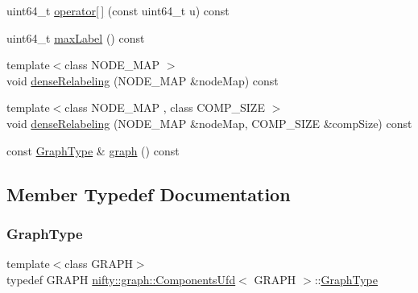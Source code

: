 \begin{DoxyCompactItemize}
\item 
uint64\+\_\+t \hyperlink{classnifty_1_1graph_1_1ComponentsUfd_a9b49939a2a5ffe4ae5c246d65d4302aa}{operator\mbox{[}$\,$\mbox{]}} (const uint64\+\_\+t u) const
\item 
uint64\+\_\+t \hyperlink{classnifty_1_1graph_1_1ComponentsUfd_a675a98fdcf175d7157041633cde35c37}{max\+Label} () const
\item 
{\footnotesize template$<$class N\+O\+D\+E\+\_\+\+M\+AP $>$ }\\void \hyperlink{classnifty_1_1graph_1_1ComponentsUfd_af9d0873f2dd65ca662fe886ef3ae43ff}{dense\+Relabeling} (N\+O\+D\+E\+\_\+\+M\+AP \&node\+Map) const
\item 
{\footnotesize template$<$class N\+O\+D\+E\+\_\+\+M\+AP , class C\+O\+M\+P\+\_\+\+S\+I\+ZE $>$ }\\void \hyperlink{classnifty_1_1graph_1_1ComponentsUfd_a40304c705953ef4b0d74308f083c12a3}{dense\+Relabeling} (N\+O\+D\+E\+\_\+\+M\+AP \&node\+Map, C\+O\+M\+P\+\_\+\+S\+I\+ZE \&comp\+Size) const
\item 
const \hyperlink{classnifty_1_1graph_1_1ComponentsUfd_a022ccf51b6dd4a943d3d614b97faa783}{Graph\+Type} \& \hyperlink{classnifty_1_1graph_1_1ComponentsUfd_a98cca33e98d6e1d9172c6fe65ceae849}{graph} () const
\end{DoxyCompactItemize}


\subsection{Member Typedef Documentation}
\mbox{\label{classnifty_1_1graph_1_1ComponentsUfd_a022ccf51b6dd4a943d3d614b97faa783}} 
\subsubsection{\texorpdfstring{Graph\+Type}{GraphType}}
{\footnotesize\ttfamily template$<$class G\+R\+A\+PH$>$ \\
typedef G\+R\+A\+PH \hyperlink{classnifty_1_1graph_1_1ComponentsUfd}{nifty\+::graph\+::\+Components\+Ufd}$<$ G\+R\+A\+PH $>$\+::\hyperlink{classnifty_1_1graph_1_1ComponentsUfd_a022ccf51b6dd4a943d3d614b97faa783}{Graph\+Type}}



